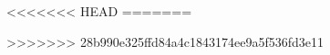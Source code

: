 \documentclass[12pt,a4paper]{article}
\begin{document}
    
    \tableofcontents  
    \listoftables
    \listoffigures
    \newpage
    \normalsize
    
<<<<<<< HEAD
=======
     
>>>>>>> 28b990e325ffd84a4c1843174ee9a5f536fd3e11
     
\end{document}
